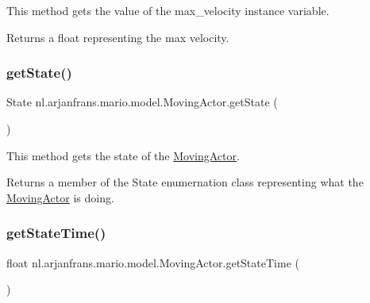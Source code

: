 This method gets the value of the max\+\_\+velocity instance variable. 

\begin{DoxyReturn}{Returns}
a float representing the max velocity. 
\end{DoxyReturn}
\mbox{\label{classnl_1_1arjanfrans_1_1mario_1_1model_1_1MovingActor_a40606a6b3bdc2afe43cfba764b00af4c}} 
\subsubsection{\texorpdfstring{get\+State()}{getState()}}
{\footnotesize\ttfamily State nl.\+arjanfrans.\+mario.\+model.\+Moving\+Actor.\+get\+State (\begin{DoxyParamCaption}{ }\end{DoxyParamCaption})}



This method gets the state of the \hyperlink{classnl_1_1arjanfrans_1_1mario_1_1model_1_1MovingActor}{Moving\+Actor}. 

\begin{DoxyReturn}{Returns}
a member of the State enumernation class representing what the \hyperlink{classnl_1_1arjanfrans_1_1mario_1_1model_1_1MovingActor}{Moving\+Actor} is doing. 
\end{DoxyReturn}
\mbox{\label{classnl_1_1arjanfrans_1_1mario_1_1model_1_1MovingActor_a2f5be4a9802efe50a98368729ab46472}} 
\subsubsection{\texorpdfstring{get\+State\+Time()}{getStateTime()}}
{\footnotesize\ttfamily float nl.\+arjanfrans.\+mario.\+model.\+Moving\+Actor.\+get\+State\+Time (\begin{DoxyParamCaption}{ }\end{DoxyParamCaption})}



